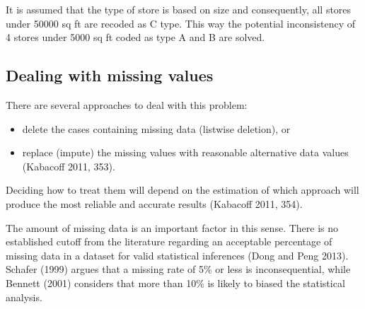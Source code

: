 \documentclass[11pt,]{article}
\newenvironment{Shaded}{\begin{snugshade}}{\end{snugshade}}
\newcommand{\DataTypeTok}[1]{\textcolor[rgb]{0.13,0.29,0.53}{{#1}}}
\newcommand{\DecValTok}[1]{\textcolor[rgb]{0.00,0.00,0.81}{{#1}}}
\newcommand{\StringTok}[1]{\textcolor[rgb]{0.31,0.60,0.02}{{#1}}}
\newcommand{\CommentTok}[1]{\textcolor[rgb]{0.56,0.35,0.01}{\textit{{#1}}}}
\newcommand{\NormalTok}[1]{{#1}}
\begin{document}
It is assumed that the type of store is based on size and consequently,
all stores under 50000 sq ft are recoded as C type. This way the
potential inconsistency of 4 stores under 5000 sq ft coded as type A and
B are solved.

\begin{Shaded}
\end{Shaded}

\subsection{Dealing with missing
values}\label{dealing-with-missing-values}

There are several approaches to deal with this problem:

\begin{itemize}
\item
  delete the cases containing missing data (listwise deletion), or
\item
  replace (impute) the missing values with reasonable alternative data
  values (Kabacoff 2011, 353).
\end{itemize}

Deciding how to treat them will depend on the estimation of which
approach will produce the most reliable and accurate results (Kabacoff
2011, 354).

The amount of missing data is an important factor in this sense. There
is no established cutoff from the literature regarding an acceptable
percentage of missing data in a dataset for valid statistical inferences
(Dong and Peng 2013). Schafer (1999) argues that a missing rate of 5\%
or less is inconsequential, while Bennett (2001) considers that more
than 10\% is likely to biased the statistical analysis.
\end{document}
